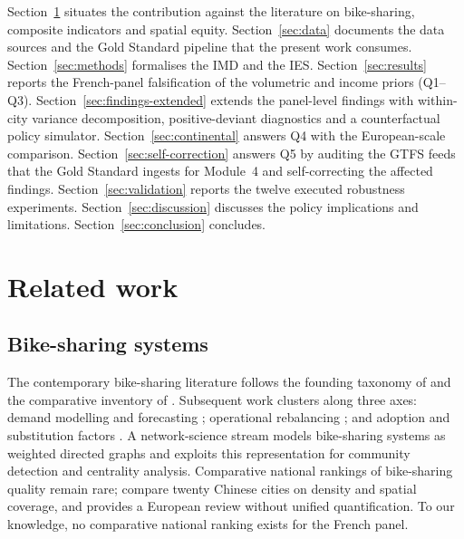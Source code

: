 \documentclass[11pt,a4paper]{article}
\begin{document}
Section~\ref{sec:related} situates the contribution against the
literature on bike-sharing, composite indicators and spatial
equity. Section~\ref{sec:data} documents the data sources and
the Gold Standard pipeline that the present work consumes.
Section~\ref{sec:methods} formalises the IMD and the IES.
Section~\ref{sec:results} reports the French-panel falsification
of the volumetric and income priors (Q1--Q3).
Section~\ref{sec:findings-extended} extends the panel-level
findings with within-city variance decomposition, positive-deviant
diagnostics and a counterfactual policy simulator.
Section~\ref{sec:continental} answers Q4 with the European-scale
comparison. Section~\ref{sec:self-correction} answers Q5 by
auditing the GTFS feeds that the Gold Standard ingests for
Module~4 and self-correcting the affected findings.
Section~\ref{sec:validation} reports the twelve executed
robustness experiments. Section~\ref{sec:discussion} discusses
the policy implications and limitations.
Section~\ref{sec:conclusion} concludes.

\section{Related work}
\label{sec:related}

\subsection{Bike-sharing systems}

The contemporary bike-sharing literature follows the founding
taxonomy of \citet{DeMaio2009} and the comparative inventory of
\citet{Shaheen2010}. Subsequent work clusters along three axes:
demand modelling and forecasting \citep{FaghihImani2014,
FaghihImani2015, Vogel2011, Hampshire2012}; operational rebalancing
\citep{Raviv2013, Forma2015}; and adoption and substitution
factors \citep{Buck2013, Fishman2013, Fishman2016, Eren2020}. A
network-science stream models bike-sharing systems as weighted
directed graphs \citep{Borgnat2011, Etienne2014, Saberi2018} and
exploits this representation for community detection and
centrality analysis. Comparative national rankings of bike-sharing
quality remain rare; \citet{Gu2019} compare twenty Chinese cities
on density and spatial coverage, and \citet{Fishman2016} provides
a European review without unified quantification. To our
knowledge, no comparative national ranking exists for the French
panel.
\end{document}
